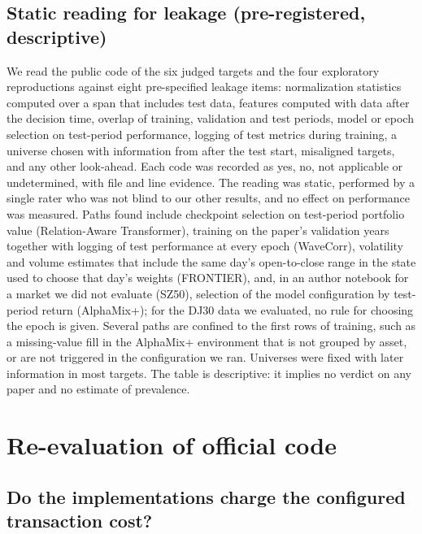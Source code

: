 \documentclass[12pt,a4paper]{report}
\begin{document}
\section{Static reading for leakage (pre-registered,
descriptive)}\label{static-reading-for-leakage-pre-registered-descriptive}

We read the public code of the six judged targets and the four
exploratory reproductions against eight pre-specified leakage items:
normalization statistics computed over a span that includes test data,
features computed with data after the decision time, overlap of
training, validation and test periods, model or epoch selection on
test-period performance, logging of test metrics during training, a
universe chosen with information from after the test start, misaligned
targets, and any other look-ahead. Each code was recorded as yes, no,
not applicable or undetermined, with file and line evidence. The reading
was static, performed by a single rater who was not blind to our other
results, and no effect on performance was measured. Paths found include
checkpoint selection on test-period portfolio value (Relation-Aware
Transformer), training on the paper's validation years together with
logging of test performance at every epoch (WaveCorr), volatility and
volume estimates that include the same day's open-to-close range in the
state used to choose that day's weights (FRONTIER), and, in an author
notebook for a market we did not evaluate (SZ50), selection of the model
configuration by test-period return (AlphaMix+); for the DJ30 data we
evaluated, no rule for choosing the epoch is given. Several paths are
confined to the first rows of training, such as a missing-value fill in
the AlphaMix+ environment that is not grouped by asset, or are not
triggered in the configuration we ran. Universes were fixed with later
information in most targets. The table is descriptive: it implies no
verdict on any paper and no estimate of prevalence.

\chapter{Re-evaluation of official
code}\label{chapter-7.-re-evaluation-of-official-code}

\section{Do the implementations charge the configured transaction
cost?}\label{do-the-implementations-charge-the-configured-transaction-cost}
\end{document}
